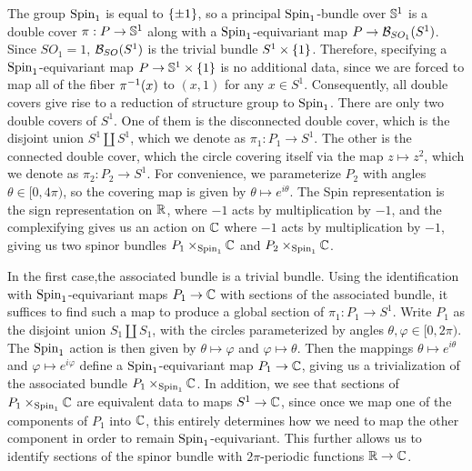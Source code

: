 \begin{exmp}
The group $\Spin_1$ is equal to $\set{\pm 1}$, so a principal $\Spin_1$-bundle
over $\S^1$ is a double cover $\pi : P \to \S^1$ along with a $\Spin_1$-equivariant
map $P \to \B_{SO_1}(S^1)$. Since $SO_1 = 1$, $\B_{SO}(S^1)$ is the trivial
bundle $S^1 \times \set{1}$. Therefore, specifying a $\Spin_1$-equivariant map
$P \to \S^1 \times \set{1}$ is no additional data, since we are forced to map
all of the fiber $\pi\inv(x)$ to $(x,1)$ for any $x \in S^1$. Consequently,
all double covers give rise to a reduction of structure group to $\Spin_1$.
There are only two double covers of $S^1$. One of them is the disconnected
double cover, which is the disjoint union $S^1 \coprod S^1$, which we denote
as $\pi_1 : P_1 \to S^1$. The other is the connected double cover, which the
circle covering itself via the map $z \mapsto z^2$, which we denote as
$\pi_2 : P_2 \to S^1$. For convenience, we parameterize $P_2$ with angles
$\theta \in [0, 4\pi)$, so the covering map is given by $\theta \mapsto e^{i\theta}$.
The Spin representation is the sign representation on $\R$, where $-1$
acts by multiplication by $-1$, and the complexifying gives us an action on
$\C$ where $-1$ acts by multiplication by $-1$, giving us two spinor bundles
$P_1 \times_{\Spin_1} \C$ and $P_2 \times_{\Spin_1} \C$.

In the first case,the associated bundle is a trivial bundle. Using the identification
with $\Spin_1$-equivariant maps $P_1 \to \C$ with sections of the associated
bundle, it suffices to find such a map to produce a global section of
$\pi_1 : P_1 \to S^1$. Write $P_1$ as the disjoint union $S_1 \coprod S_1$,
with the circles parameterized by angles $\theta,\varphi \in [0,2\pi)$.
The $\Spin_1$ action is then given by $\theta \mapsto \varphi$ and
$\varphi \mapsto \theta$. Then the mappings $\theta \mapsto e^{i\theta}$
and $\varphi \mapsto e^{i\varphi}$ define a $\Spin_1$-equivariant map
$P_1 \to \C$, giving us a trivialization of the associated bundle
$P_1 \times_{\Spin_1} \C$. In addition, we see that sections of $P_1\times_{\Spin_1}\C$
are equivalent data to maps $S^1 \to \C$, since once we map one of the components
of $P_1$ into $\C$, this entirely determines how we need to map the other component
in order to remain $\Spin_1$-equivariant. This further allows us to identify
sections of the spinor bundle with $2\pi$-periodic functions $\R \to \C$.


\end{exmp}
